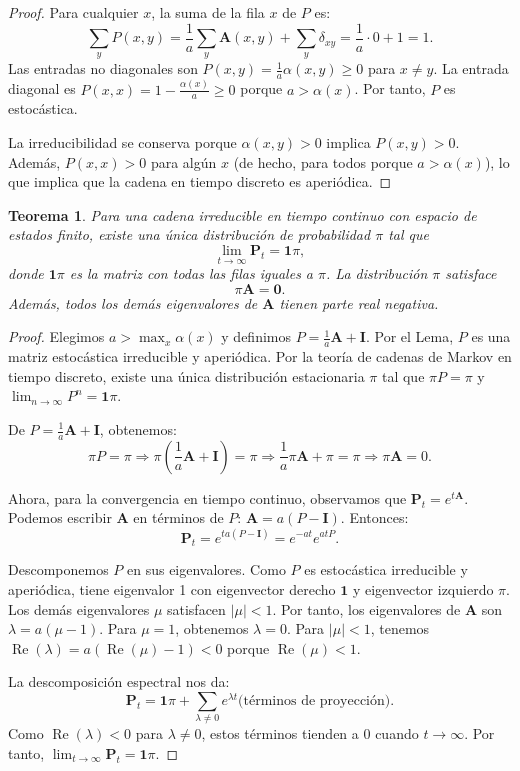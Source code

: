 \documentclass{article}
\theoremstyle{plain}
\newtheorem{Teorema}{Teorema}[section]
\theoremstyle{definition}
\newcommand{\A}{\mathbf{A}}
\newcommand{\I}{\mathbf{I}}
\newcommand{\PP}{\mathbf{P}}
\newcommand{\ind}{\mathbf{1}}  %
\begin{document}
\begin{proof}
  Para cualquier $x$, la suma de la fila $x$ de $P$ es:
  \[ \sum_y P(x,y) = \frac{1}{a}\sum_y \A(x,y) + \sum_y \delta_{xy} = \frac{1}{a}\cdot 0 + 1 = 1. \]
  Las entradas no diagonales son $P(x,y) = \frac{1}{a}\alpha(x,y) \geq 0$ para $x \neq y$. La entrada diagonal es $P(x,x) = 1 - \frac{\alpha(x)}{a} \geq 0$ porque $a > \alpha(x)$. Por tanto, $P$ es estoc\'astica.

  La irreducibilidad se conserva porque $\alpha(x,y) > 0$ implica $P(x,y) > 0$. Adem\'as, $P(x,x) > 0$ para alg\'un $x$ (de hecho, para todos porque $a > \alpha(x)$), lo que implica que la cadena en tiempo discreto es aperi\'odica.
\end{proof}

\begin{Teorema}
  Para una cadena irreducible en tiempo continuo con espacio de estados finito, existe una \'unica distribuci\'on de probabilidad $\pi$ tal que
  \[ \lim_{t\to\infty} \PP_t = \ind\pi, \]
  donde $\ind\pi$ es la matriz con todas las filas iguales a $\pi$. La distribuci\'on $\pi$ satisface
  \[ \pi \A = \mathbf{0}. \]
  Adem\'as, todos los dem\'as eigenvalores de $\A$ tienen parte real negativa.
\end{Teorema}

\begin{proof}
  Elegimos $a > \max_x \alpha(x)$ y definimos $P = \frac{1}{a}\A + \I$. Por el Lema, $P$ es una matriz estoc\'astica irreducible y aperi\'odica. Por la teor\'ia de cadenas de Markov en tiempo discreto, existe una \'unica distribuci\'on estacionaria $\pi$ tal que $\pi P = \pi$ y $\lim_{n\to\infty} P^n = \ind\pi$.

  De $P = \frac{1}{a}\A + \I$, obtenemos:
  \[ \pi P = \pi \Rightarrow \pi\left(\frac{1}{a}\A + \I\right) = \pi \Rightarrow \frac{1}{a}\pi\A + \pi = \pi \Rightarrow \pi\A = 0. \]

  Ahora, para la convergencia en tiempo continuo, observamos que $\PP_t = e^{t\A}$. Podemos escribir $\A$ en t\'erminos de $P$: $\A = a(P - \I)$. Entonces:
  \[ \PP_t = e^{t a(P - \I)} = e^{-a t} e^{a t P}. \]

  Descomponemos $P$ en sus eigenvalores. Como $P$ es estoc\'astica irreducible y aperi\'odica, tiene eigenvalor 1 con eigenvector derecho $\ind$ y eigenvector izquierdo $\pi$. Los dem\'as eigenvalores $\mu$ satisfacen $|\mu| < 1$. Por tanto, los eigenvalores de $\A$ son $\lambda = a(\mu - 1)$. Para $\mu = 1$, obtenemos $\lambda = 0$. Para $|\mu| < 1$, tenemos $\operatorname{Re}(\lambda) = a(\operatorname{Re}(\mu) - 1) < 0$ porque $\operatorname{Re}(\mu) < 1$.

  La descomposici\'on espectral nos da:
  \[ \PP_t = \ind\pi + \sum_{\lambda \neq 0} e^{\lambda t} \text{(t\'erminos de proyecci\'on)}. \]
  Como $\operatorname{Re}(\lambda) < 0$ para $\lambda \neq 0$, estos t\'erminos tienden a 0 cuando $t \to \infty$. Por tanto, $\lim_{t\to\infty} \PP_t = \ind\pi$.
\end{proof}
\end{document}
